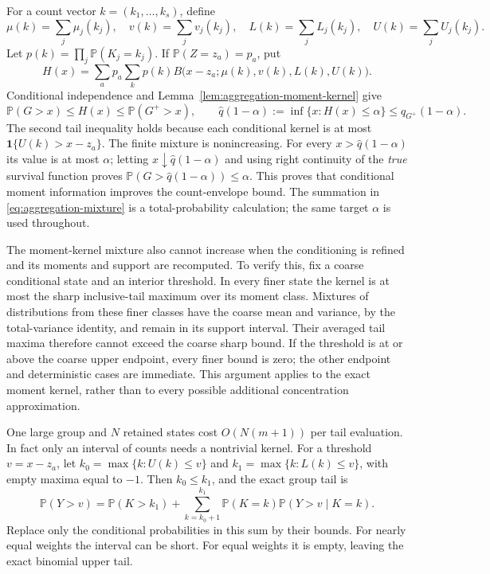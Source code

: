 \documentclass[11pt,letterpaper]{article}
\numberwithin{equation}{section}
\theoremstyle{definition}
\theoremstyle{remark}
\newcommand{\Pbb}{\mathbb P}
\begin{document}
For a count vector $k=(k_1,\ldots,k_s)$, define
\[
 \mu(k)=\sum_j\mu_j(k_j),\quad v(k)=\sum_jv_j(k_j),\quad
 L(k)=\sum_jL_j(k_j),\quad U(k)=\sum_jU_j(k_j).
\]
Let $p(k)=\prod_j\Pbb(K_j=k_j)$. If $\Pbb(Z=z_a)=p_a$, put
\begin{equation}
 H(x)=\sum_a p_a\sum_k p(k)
       B\bigl(x-z_a;\mu(k),v(k),L(k),U(k)\bigr).
 \label{eq:aggregation-mixture}
\end{equation}
Conditional independence and Lemma~\ref{lem:aggregation-moment-kernel}
give
\begin{equation}
 \Pbb(G>x)\le H(x)\le\Pbb(G^+>x),\qquad
 \widehat q(1-\alpha):=\inf\{x:H(x)\le\alpha\}
       \le q_{G^+}(1-\alpha).
 \label{eq:aggregation-mixture-quantile}
\end{equation}
The second tail inequality holds because each conditional kernel is at
most $\mathbf1\{U(k)>x-z_a\}$. The finite mixture is nonincreasing. For every
$x>\widehat q(1-\alpha)$ its value is at most $\alpha$; letting
$x\downarrow\widehat q(1-\alpha)$ and using right continuity of the
\emph{true} survival function proves
$\Pbb(G>\widehat q(1-\alpha))\le\alpha$. This proves that conditional
moment information improves the count-envelope bound. The summation in
\eqref{eq:aggregation-mixture} is a total-probability calculation; the
same target $\alpha$ is used throughout.

The moment-kernel mixture also cannot increase when the conditioning is
refined and its moments and support are recomputed. To verify this, fix a
coarse conditional state and an interior threshold. In every finer state
the kernel is at most the sharp inclusive-tail maximum over its moment
class. Mixtures of distributions from these finer classes have the coarse
mean and variance, by the total-variance identity, and remain in its
support interval. Their averaged tail maxima therefore cannot exceed the
coarse sharp bound. If the threshold is at or above the coarse upper
endpoint, every finer bound is zero; the other endpoint and deterministic
cases are immediate. This argument applies to the exact moment kernel,
rather than to every possible additional concentration approximation.

One large group and $N$ retained states cost $O(N(m+1))$ per tail
evaluation. In fact only an interval of counts needs a nontrivial kernel.
For a threshold $v=x-z_a$, let
$k_0=\max\{k:U(k)\le v\}$ and
$k_1=\max\{k:L(k)\le v\}$, with empty maxima equal to $-1$.
Then $k_0\le k_1$, and the exact group tail is
\begin{equation}
 \Pbb(Y>v)=\Pbb(K>k_1)
   +\sum_{k=k_0+1}^{k_1}\Pbb(K=k)\Pbb(Y>v\mid K=k).
 \label{eq:aggregation-ambiguity-band}
\end{equation}
Replace only the conditional probabilities in this sum by their bounds.
For nearly equal weights the interval can be short. For equal weights it
is empty, leaving the exact binomial upper tail.
\end{document}
